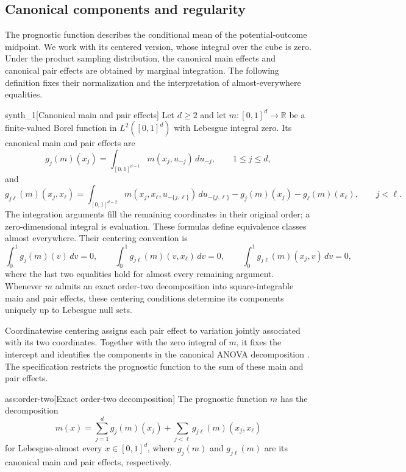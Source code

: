\documentclass[11pt]{article}
\begin{document}
\subsection{Canonical components and regularity}

The prognostic function  describes the conditional mean of the potential-outcome midpoint. We work with its centered version, whose integral over the cube is zero. Under the product sampling distribution, the canonical main effects  and canonical pair effects  are obtained by marginal integration. The following definition fixes their normalization and the interpretation of almost-everywhere equalities.

\begin{definitionv}{synth_1}[Canonical main and pair effects]
Let \(d\geq2\) and let \(m:[0,1]^d\to\mathbb R\) be a finite-valued Borel function in \(L^2([0,1]^d)\) with Lebesgue integral zero. Its canonical main and pair effects are
\[
g_j(m)(x_j)
=\int_{[0,1]^{d-1}}m(x_j,u_{-j})\,du_{-j},
\qquad 1\leq j\leq d,
\]
and
\[
g_{j\ell}(m)(x_j,x_\ell)
=\int_{[0,1]^{d-2}}
m(x_j,x_\ell,u_{-\{j,\ell\}})\,du_{-\{j,\ell\}}
-g_j(m)(x_j)-g_\ell(m)(x_\ell),
\qquad j<\ell.
\]
The integration arguments fill the remaining coordinates in their original order; a zero-dimensional integral is evaluation. These formulas define equivalence classes almost everywhere. Their centering convention is
\[
\int_0^1g_j(m)(v)\,dv=0,
\qquad
\int_0^1g_{j\ell}(m)(v,x_\ell)\,dv=0,
\qquad
\int_0^1g_{j\ell}(m)(x_j,v)\,dv=0,
\]
where the last two equalities hold for almost every remaining argument. Whenever \(m\) admits an exact order-two decomposition into square-integrable main and pair effects, these centering conditions determine its components uniquely up to Lebesgue null sets.
\end{definitionv}

Coordinatewise centering assigns each pair effect to variation jointly associated with its two coordinates. Together with the zero integral of \(m\), it fixes the intercept and identifies the components in the canonical ANOVA decomposition \citep{Hoeffding1948,Sobol1993}. The specification restricts the prognostic function to the sum of these main and pair effects.

\begin{assumptionv}{ass:order-two}[Exact order-two decomposition]
The prognostic function \(m\) has the decomposition
\[
m(x)=\sum_{j=1}^d g_j(m)(x_j)
+\sum_{j<\ell}g_{j\ell}(m)(x_j,x_\ell)
\]
for Lebesgue-almost every \(x\in[0,1]^d\), where \(g_j(m)\) and \(g_{j\ell}(m)\) are its canonical main and pair effects, respectively.
\end{assumptionv}
\end{document}
